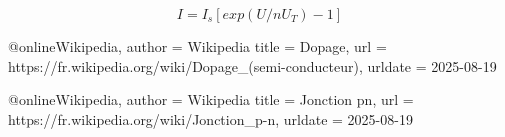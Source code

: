 \documentclass{article}
\begin{document}
                    \begin{equation}
                        I = I_s[exp(U/nU_T)-1]
                    \end{equation}

    \begin{thebibliography}
        @online{Wikipedia,
            author = {Wikipedia}
            title = {Dopage},
            url = {https://fr.wikipedia.org/wiki/Dopage_(semi-conducteur)},
            urldate = {2025-08-19}
        }
        
        @online{Wikipedia,
            author = {Wikipedia}
            title = {Jonction pn},
            url = {https://fr.wikipedia.org/wiki/Jonction_p-n},
            urldate = {2025-08-19}
        }
    \end{thebibliography}
\end{document}
